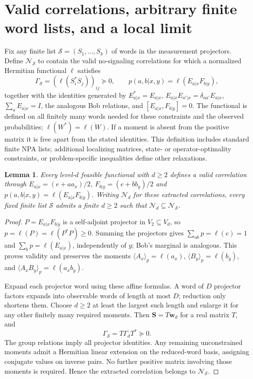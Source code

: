 \documentclass[11pt]{article}
\newtheorem{lemma}[theorem]{Lemma}
\theoremstyle{remark}\newtheorem{remark}[theorem]{Remark}
\begin{document}
\section{Valid correlations, arbitrary finite word lists, and a local limit}
\label{supp:sec:transfer}
Fix any finite list $\mathcal S=(S_1,\ldots,S_k)$ of words in the
measurement projectors. Define $\mathcal N_{\mathcal S}$ to contain the
valid no-signaling correlations for which a normalized Hermitian functional
$\ell$ satisfies
\begin{equation}
\Gamma_{\mathcal S}=(\ell(S_i^*S_j))_{ij}\succeq0,\qquad
p(a,b|x,y)=\ell(E_{a|x}F_{b|y}),
\label{supp:eq:selected-moment-matrix}
\end{equation}
together with the identities generated by
$E_{a|x}^*=E_{a|x}$,
$E_{a|x}E_{a'|x}=\delta_{aa'}E_{a|x}$, $\sum_aE_{a|x}=I$,
the analogous Bob relations, and $[E_{a|x},F_{b|y}]=0$.
The functional is defined on all finitely many words needed for these
constraints and the observed probabilities; $\ell(W^*)=\overline{\ell(W)}$.
If a moment is absent from the positive matrix it is free apart from the
stated identities. This definition includes standard finite NPA lists;
additional localizing matrices, state- or operator-optimality constraints,
or problem-specific inequalities define other relaxations.

\begin{lemma}
\label{supp:lem:valid-behavior}\label{supp:lem:finite-list-containment}
Every level-$d$ feasible functional with $d\geq2$ defines a valid
correlation through
$E_{a|x}=(e+aa_x)/2$, $F_{b|y}=(e+bb_y)/2$ and
$p(a,b|x,y)=\ell(E_{a|x}F_{b|y})$.
Writing $\mathcal N_d$ for these extracted correlations, every fixed
finite list $\mathcal S$ admits a finite $d\geq2$ such that
$\mathcal N_d\subseteq\mathcal N_{\mathcal S}$.
\end{lemma}
\begin{proof}
$P=E_{a|x}F_{b|y}$ is a self-adjoint projector in $V_2\subseteq V_d$,
so $p=\ell(P)=\ell(P^*P)\geq0$. Summing the projectors gives
$\sum_{ab}p=\ell(e)=1$ and $\sum_bp=\ell(E_{a|x})$, independently
of $y$; Bob's marginal is analogous. This proves validity and preserves
the moments $\langle A_x\rangle_p=\ell(a_x)$,
$\langle B_y\rangle_p=\ell(b_y)$, and
$\langle A_xB_y\rangle_p=\ell(a_xb_y)$.

Expand each projector word using these affine formulas. A word of $D$
projector factors expands into observable words of length at most $D$;
reduction only shortens them. Choose $d\geq2$ at least the largest such
length and enlarge it for any other finitely many required moments. Then
$\bm S=T\bm w_d$ for a real matrix $T$, and
\begin{equation}
\Gamma_{\mathcal S}=T\Gamma_dT^*\succeq0.
\label{supp:eq:congruence}
\end{equation}
The group relations imply all projector identities. Any remaining
unconstrained moments admit a Hermitian linear extension on the reduced-word
basis, assigning conjugate values on inverse pairs. No further positive
matrix involving those moments is required. Hence the extracted correlation
belongs to $\mathcal N_{\mathcal S}$.
\end{proof}
\end{document}
